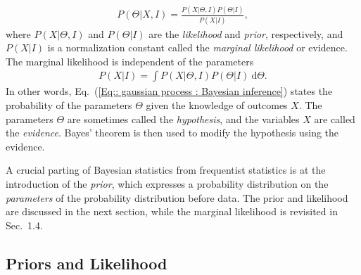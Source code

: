 \documentclass[twoside,english]{uiofysmaster}
\begin{document}
{\begin{align}\label{Eq:: gaussian process : Bayesian inference}
P(\Theta | X , I) = \frac{P(X|\Theta, I) P(\Theta| I)}{P(X | I)},
\end{align}
where $P(X|\Theta, I)$  and $P(\Theta |I)$ are the \textit{likelihood} and \textit{prior}, respectively, and $P(X|I)$ is a normalization constant called the \textit{marginal likelihood} or evidence. The marginal likelihood is independent of the parameters
\begin{align}
P(X|I) = \int P(X| \Theta, I) P(\Theta | I)~ \text{d} \Theta.
\end{align}
In other words, Eq.~(\ref{Eq:: gaussian process : Bayesian inference}) states the probability of the parameters $\Theta$ given the knowledge of outcomes $X$. The parameters $\Theta$ are sometimes called the \textit{hypothesis}, and the variables $X$ are called the \textit{evidence}. Bayes' theorem is then used to modify the hypothesis using the evidence. 

A crucial parting of Bayesian statistics from frequentist statistics is at the introduction of the \textit{prior}, which expresses a probability distribution on the \textit{parameters} of the probability distribution before data. The prior and likelihood are discussed in the next section, while the marginal likelihood is revisited in Sec.~1.4.

\subsection{Priors and Likelihood}\label{Sec:: gaussian process : Priors and Likelihood}

}
\end{document}
